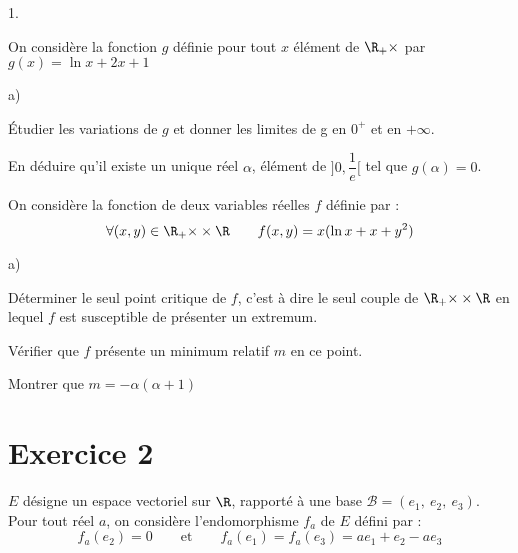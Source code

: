 \documentclass[11pt]{article}%
\begin{document}
\begin{noliste}{1.}
 \setlength{\itemsep}{4mm}
\item On considère la fonction $g$ définie pour tout $x$ élément de
$\R_{+}{\times }$ par $g(x) = \ln x + 2x + 1$

\begin{noliste}{a)}
 \setlength{\itemsep}{2mm}
\item Étudier les variations de $g$ et donner les limites de g en
$0^{+}$ et
en $ + \infty $.

\item En déduire qu'il existe un unique réel $\alpha $, élément de
$]0,\dfrac{1}{e}[$ tel que $g(\alpha ) = 0$.
\end{noliste}

\item On considère la fonction de deux variables réelles $f$ définie
par : 
\[
\forall (x,y)\in \R_{+}{\times }\times \R\qquad
f(x,y) = x(\ln x + x + y^{2})
\]

\begin{noliste}{a)}
 \setlength{\itemsep}{2mm}
\item Déterminer le seul point critique de $f$, c'est à dire le seul
couple
de $\R_{+}{\times }\times \R$ en lequel $f$ est susceptible
de présenter un extremum.

\item Vérifier que $f$ présente un minimum relatif $m$ en ce point.

\item Montrer que $m = -\alpha (\alpha + 1)$
\end{noliste}
\end{noliste}

\section*{Exercice 2}

$E$ désigne un espace vectoriel sur $\R$, rapporté à une base
$\mathcal{B} = (e_{1},\ e_{2},\ e_{3})$.\\
Pour tout réel $a$, on considère l'endomorphisme $f_{a}$ de $E$ défini
par : 
\[
f_{a}(e_{2}) = 0\qquad \text{et}\qquad
f_{a}(e_{1}) = f_{a}(e_{3}) = ae_{1} + e_{2}-ae_{3}
\]
\end{document}
